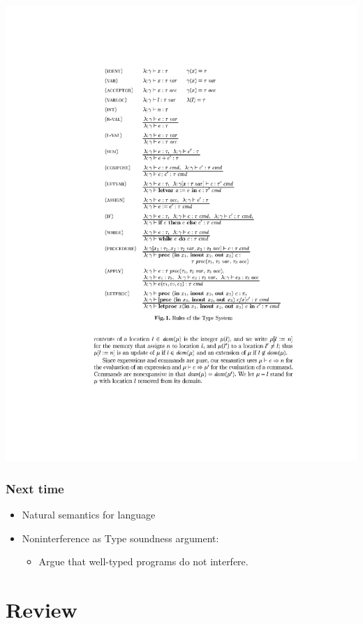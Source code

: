 \documentclass{beamer}
\begin{document}
\begin{frame}[fragile]
\begin{center}
\includegraphics[scale=1.2]{figures/typesys3}
\end{center}
\end{frame}

\begin{frame}
\frametitle{Next time}
\begin{itemize}
\item Natural semantics for language
\item Noninterference as Type soundness argument:
\begin{itemize}
\item Argue that well-typed programs do not interfere.
\end{itemize}
\end{itemize}
\end{frame}

\section{Review}
\end{document}
